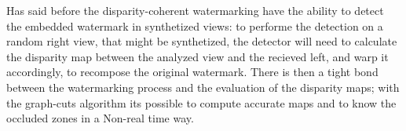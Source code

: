 Has said before the disparity-coherent watermarking have the ability to detect the embedded watermark in synthetized views: to performe the detection on a random right view, that might be synthetized, the detector will need to calculate the disparity map between the analyzed view and the recieved left, and warp it accordingly, to recompose the original watermark.\newline 
There is then a tight bond between the watermarking process and the evaluation of the disparity maps; with the graph-cuts algorithm its possible to compute accurate maps and to know the occluded zones in a Non-real time way. 
